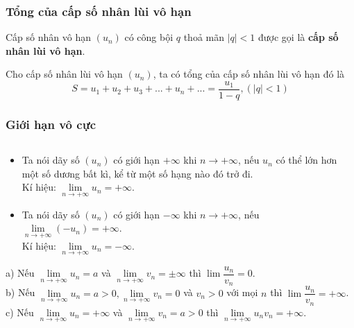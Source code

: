 \subsubsection{Tổng của cấp số nhân lùi vô hạn}
\begin{dn}
	Cấp số nhân vô hạn $(u_n)$ có công bội $q$ thoả mãn $|q|<1$ được gọi là \textbf{cấp số nhân lùi vô hạn}.
\end{dn}

\begin{dl}
Cho cấp số nhân lùi vô hạn $(u_n)$, ta có tổng của cấp số nhân lùi vô hạn đó là $$S=u_1+u_2+u_3+...+u_n+...=\dfrac{u_1}{1-q}, (|q|<1)$$
\end{dl}

\subsubsection{Giới hạn vô cực}
\begin{dn} $\textrm{ }$\\	
\begin{itemize}
\item  Ta nói dãy số $(u_n)$ có giới hạn $+\infty$ khi $n\to +\infty$, nếu $u_n$ có thể lớn hơn một số dương bất kì, kể từ một số hạng nào đó trở đi.\\
Kí hiệu: $\lim \limits_{n \to +\infty}u_n=+\infty$.
\item  Ta nói dãy số $(u_n)$ có giới hạn $-\infty$ khi $n\to +\infty$, nếu $\lim \limits_{n \to +\infty}(-u_n)=+\infty$.\\
Kí hiệu: $\lim \limits_{n \to +\infty}u_n=-\infty$.
\end{itemize}
\end{dn}

\begin{dl} $\textrm{ }$\\
	a) Nếu $\lim \limits_{n \to +\infty}u_n=a$ và $\lim \limits_{n \to +\infty}v_n=\pm \infty$ thì $\lim\dfrac{u_n}{v_n}=0$.\\
	b) Nếu $\lim \limits_{n \to +\infty}u_n=a>0, \lim \limits_{n \to +\infty}v_n=0$ và $v_n>0$ với mọi $n$ thì $\lim\dfrac{u_n}{v_n}=+\infty$.\\
	c) Nếu $\lim \limits_{n \to +\infty}u_n=+\infty$ và $\lim \limits_{n \to +\infty}v_n=a>0$ thì $\lim \limits_{n \to +\infty}u_nv_n=+\infty$.
\end{dl}

